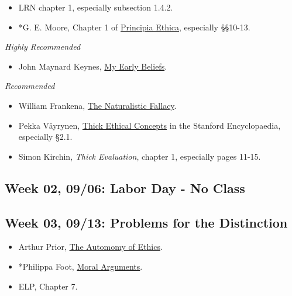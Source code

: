\documentclass[
]{article}
\providecommand{\tightlist}{%
  \setlength{\itemsep}{0pt}\setlength{\parskip}{0pt}}
\begin{document}
\begin{itemize}
\tightlist
\item
  LRN chapter 1, especially subsection 1.4.2.
\item
  *G. E. Moore, Chapter 1 of
  \href{https://brian.weatherson.org/gutenberg-files/principia_ethica/}{Principia
  Ethica}, especially §§10-13.
\end{itemize}

\emph{Highly Recommended}

\begin{itemize}
\tightlist
\item
  John Maynard Keynes, \href{http://brian.weatherson.org/meb.html}{My
  Early Beliefs}.
\end{itemize}

\emph{Recommended}

\begin{itemize}
\tightlist
\item
  William Frankena,
  \href{https://www.jstor.org/stable/2250706?seq=1\#metadata_info_tab_contents}{The
  Naturalistic Fallacy}.
\item
  Pekka Väyrynen,
  \href{https://plato.stanford.edu/entries/thick-ethical-concepts/}{Thick
  Ethical Concepts} in the Stanford Encyclopaedia, especially §2.1.
\item
  Simon Kirchin, \emph{Thick Evaluation}, chapter 1, especially pages
  11-15.
\end{itemize}

\hypertarget{week-02-0906-labor-day---no-class}{%
\subsection{Week 02, 09/06: Labor Day - No
Class}\label{week-02-0906-labor-day---no-class}}

\hypertarget{week-03-0913-problems-for-the-distinction}{%
\subsection{Week 03, 09/13: Problems for the
Distinction}\label{week-03-0913-problems-for-the-distinction}}

\begin{itemize}
\tightlist
\item
  Arthur Prior,
  \href{https://www.tandfonline.com/doi/abs/10.1080/00048406085200221}{The
  Automomy of Ethics}.
\item
  *Philippa Foot, \href{https://www.jstor.org/stable/2251201}{Moral
  Arguments}.
\item
  ELP, Chapter 7.
\end{itemize}
\end{document}

